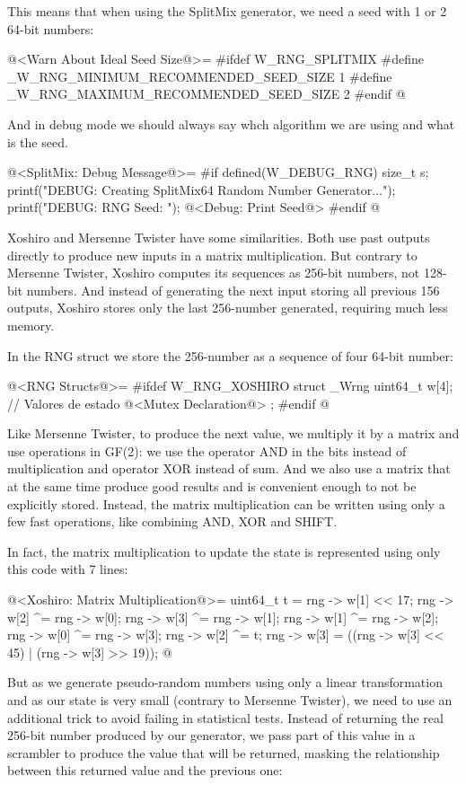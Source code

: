 This means that when using the SplitMix generator, we need a seed with
1 or 2 64-bit numbers:

\iniciocodigo
@<Warn About Ideal Seed Size@>=
#ifdef W_RNG_SPLITMIX
#define _W_RNG_MINIMUM_RECOMMENDED_SEED_SIZE  1
#define _W_RNG_MAXIMUM_RECOMMENDED_SEED_SIZE  2
#endif
@
\fimcodigo

And in debug mode we should always say whch algorithm we are using and
what is the seed.

\iniciocodigo
@<SplitMix: Debug Message@>=
#if defined(W_DEBUG_RNG)
{
  size_t s;
  printf("DEBUG: Creating SplitMix64 Random Number Generator...");
  printf("DEBUG: RNG Seed: ");
  @<Debug: Print Seed@>
}
#endif
@
\fimcodigo



Xoshiro and Mersenne Twister have some similarities. Both use past
outputs directly to produce new inputs in a matrix multiplication. But
contrary to Mersenne Twister, Xoshiro computes its sequences as
256-bit numbers, not 128-bit numbers. And instead of generating the
next input storing all previous 156 outputs, Xoshiro stores only the
last 256-number generated, requiring much less memory.

In the RNG struct we store the 256-number as a sequence of four 64-bit
number:

\iniciocodigo
@<RNG Structs@>=
#ifdef W_RNG_XOSHIRO
struct _Wrng{
  uint64_t w[4];   // Valores de estado
  @<Mutex Declaration@>
};
#endif
@
\fimcodigo

Like Mersenne Twister, to produce the next value, we multiply it by a
matrix and use operations in GF(2): we use the operator AND in the
bits instead of multiplication and operator XOR instead of sum. And we
also use a matrix that at the same time produce good results and is
convenient enough to not be explicitly stored. Instead, the matrix
multiplication can be written using only a few fast operations, like
combining AND, XOR and SHIFT.

In fact, the matrix multiplication to update the state is represented
using only this code with 7 lines:

\iniciocodigo
@<Xoshiro: Matrix Multiplication@>=
{
  uint64_t t = rng -> w[1] << 17;
  rng -> w[2] ^= rng -> w[0];
  rng -> w[3] ^= rng -> w[1];
  rng -> w[1] ^= rng -> w[2];
  rng -> w[0] ^= rng -> w[3];
  rng -> w[2] ^= t;
  rng -> w[3] = ((rng -> w[3] << 45) | (rng -> w[3] >> 19));
}
@
\fimcodigo

But as we generate pseudo-random numbers using only a linear
transformation and as our state is very small (contrary to Mersenne
Twister), we need to use an additional trick to avoid failing in
statistical tests. Instead of returning the real 256-bit number
produced by our generator, we pass part of this value in a scrambler
to produce the value that will be returned, masking the relationship
between this returned value and the previous one:

